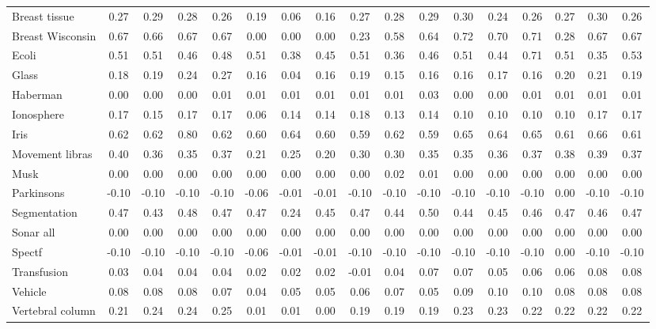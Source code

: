 \documentclass[preprint,12pt]{elsarticle}
\begin{document}
\begin{landscape}
\begin{table}[h!]
{\begin{tabular}{l c ccc ccc ccc ccc ccc}
\midrule
Breast tissue & 0.27 & 0.29 & 0.28 & 0.26 & 0.19 & 0.06 & 0.16 & 0.27 & 0.28 & 0.29 & 0.30 & 0.24 & 0.26 & 0.27 & 0.30 & 0.26 \\
Breast Wisconsin & 0.67 & 0.66 & 0.67 & 0.67 & 0.00 & 0.00 & 0.00 & 0.23 & 0.58 & 0.64 & 0.72 & 0.70 & 0.71 & 0.28 & 0.67 & 0.67 \\
Ecoli & 0.51 & 0.51 & 0.46 & 0.48 & 0.51 & 0.38 & 0.45 & 0.51 & 0.36 & 0.46 & 0.51 & 0.44 & 0.71 & 0.51 & 0.35 & 0.53 \\
Glass & 0.18 & 0.19 & 0.24 & 0.27 & 0.16 & 0.04 & 0.16 & 0.19 & 0.15 & 0.16 & 0.16 & 0.17 & 0.16 & 0.20 & 0.21 & 0.19 \\
Haberman & 0.00 & 0.00 & 0.00 & 0.01 & 0.01 & 0.01 & 0.01 & 0.01 & 0.01 & 0.03 & 0.00 & 0.00 & 0.01 & 0.01 & 0.01 & 0.01 \\
Ionosphere & 0.17 & 0.15 & 0.17 & 0.17 & 0.06 & 0.14 & 0.14 & 0.18 & 0.13 & 0.14 & 0.10 & 0.10 & 0.10 & 0.10 & 0.17 & 0.17 \\
Iris & 0.62 & 0.62 & 0.80 & 0.62 & 0.60 & 0.64 & 0.60 & 0.59 & 0.62 & 0.59 & 0.65 & 0.64 & 0.65 & 0.61 & 0.66 & 0.61 \\
Movement libras & 0.40 & 0.36 & 0.35 & 0.37 & 0.21 & 0.25 & 0.20 & 0.30 & 0.30 & 0.35 & 0.35 & 0.36 & 0.37 & 0.38 & 0.39 & 0.37 
\\
Musk & 0.00 & 0.00 & 0.00 & 0.00 & 0.00 & 0.00 & 0.00 & 0.00 & 0.02 & 0.01 & 0.00 & 0.00 & 0.00 & 0.00 & 0.00 & 0.00 \\
Parkinsons & -0.10 & -0.10 & -0.10 & -0.10 & -0.06 & -0.01 & -0.01 & -0.10 & -0.10 & -0.10 & -0.10 & -0.10 & -0.10 & 0.00 & -0.10 & -0.10 \\
Segmentation & 0.47 & 0.43 & 0.48 & 0.47 & 0.47 & 0.24 & 0.45 & 0.47 & 0.44 & 0.50 & 0.44 & 0.45 & 0.46 & 0.47 & 0.46 & 0.47 \\
Sonar all & 0.00 & 0.00 & 0.00 & 0.00 & 0.00 & 0.00 & 0.00 & 0.00 & 0.00 & 0.00 & 0.00 & 0.00 & 0.00 & 0.00 & 0.00 & 0.00 \\
Spectf & -0.10 & -0.10 & -0.10 & -0.10 & -0.06 & -0.01 & -0.01 & -0.10 & -0.10 & -0.10 & -0.10 & -0.10 & -0.10 & 0.00 & -0.10 & -0.10 \\
Transfusion & 0.03 & 0.04 & 0.04 & 0.04 & 0.02 & 0.02 & 0.02 & -0.01 & 0.04 & 0.07 & 0.07 & 0.05 & 0.06 & 0.06 & 0.08 & 0.08 \\
Vehicle & 0.08 & 0.08 & 0.08 & 0.07 & 0.04 & 0.05 & 0.05 & 0.06 & 0.07 & 0.05 & 0.09 & 0.10 & 0.10 & 0.08 & 0.08 & 0.08 \\
Vertebral column & 0.21 & 0.24 & 0.24 & 0.25 & 0.01 & 0.01 & 0.00 & 0.19 & 0.19 & 0.19 & 0.23 & 0.23 & 0.22 & 0.22 & 0.22 & 0.22 \\

\end{tabular}}
\end{table}
\end{landscape}
\end{document}
